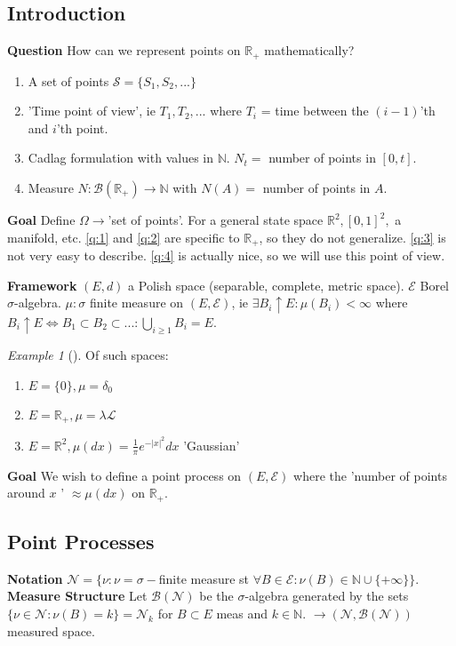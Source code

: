 \documentclass[12pt]{book}
\renewcommand{\iff}{\Leftrightarrow}
\theoremstyle{definition}
\theoremstyle{remark}
\newtheorem{ex}{Example}[section]
\begin{document}
\subsection{Introduction}
\textbf{Question} How can we represent points on $\mathbb{R}_+$ mathematically?
\begin{enumerate}
	\item A set of points $\mathcal{S}=\{S_1, S_2,...\}$ \label{q:3}
	\item 'Time point of view', ie $T_1,T_2,...$ where $T_i$ = time between the $(i-1) $'th and $i $'th point. \label{q:1}
	\item Cadlag formulation with values in $ \mathbb{N}$. $N_t=$ number of points in $[0,t]$. \label{q:2}
	\item Measure $N: \mathcal{B}(\mathbb{R}_+) \to \mathbb{N}$ with $N(A)=$ number of points in $A$. \label{q:4}
\end{enumerate}
\textbf{Goal} Define $\Omega \to $'set of points'. For a general state space $\mathbb{R}^2, [0,1]^2,$ a manifold, etc. 
\ref{q:1} and \ref{q:2} are specific to $\mathbb{R}_+$, so they do not generalize. \ref{q:3} is not very easy to describe. \ref{q:4} is actually nice, so we will  use this point of view.

\textbf{Framework} $(E,d)$ a Polish space (separable, complete, metric space). $\mathcal{E}$ Borel $\sigma$-algebra. $\mu: \sigma$ finite measure on $(E, \mathcal{E})$, ie  $\exists  B_i \uparrow E: \mu(B_i)<\infty$ where $B_i \uparrow E \iff B_1 \subset B_2 \subset...: \bigcup_{i\geq 1}B_i=E$.

\begin{ex}[] Of such spaces: 
\begin{enumerate}
	\item $E=\{0\}, \mu = \delta_0$
	\item $E=\mathbb{R}_+, \mu = \lambda \mathcal{L}$
	\item $E=\mathbb{R}^2, \mu(dx)=\frac{1}{\pi} e^{- |x|^2}dx$ 'Gaussian'
\end{enumerate}
\end{ex}

\textbf{Goal} We wish to define a point process on $(E, \mathcal{E})$ where the 'number of points around $x$ ' $\approx \mu(dx)$ on $\mathbb{R}_+$. 

\subsection{Point Processes}
\textbf{Notation} $\mathcal{N}=\{\nu: \nu=\sigma-$finite measure st $\forall B \in \mathcal{E}: \nu(B) \in \mathbb{N} \cup \{+\infty\}\}$.
\noindent
\textbf{Measure Structure} Let $\mathcal{B}(\mathcal{N})$ be the $\sigma$-algebra generated by the sets $\{\nu \in \mathcal{N}: \nu(B)=k\}=\mathcal{N}_k$ for $B \subset E$ meas and $k \in \mathbb{N}$. $\to (\mathcal{N}, \mathcal{B}(\mathcal{N}))$ measured space.
\end{document}
